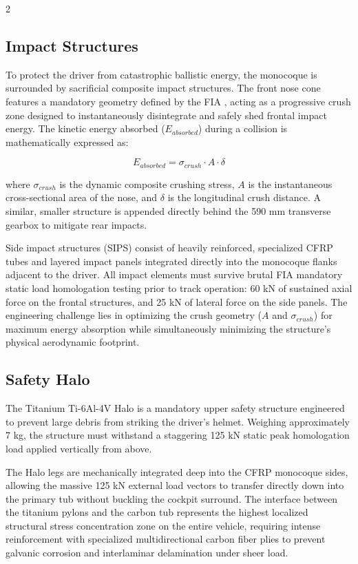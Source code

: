 \begin{multicols}{2}
\subsection{Impact Structures}

To protect the driver from catastrophic ballistic energy, the monocoque is surrounded by sacrificial composite impact structures. The front nose cone features a mandatory geometry defined by the FIA \cite{FIA_2026_Chassis_Regulations}, acting as a progressive crush zone designed to instantaneously disintegrate and safely shed frontal impact energy. The kinetic energy absorbed ($E_{absorbed}$) during a collision is mathematically expressed as:

\begin{equation} \label{eq:crush_energy}
E_{absorbed} = \sigma_{crush} \cdot A \cdot \delta
\end{equation}

where $\sigma_{crush}$ is the dynamic composite crushing stress, $A$ is the instantaneous cross-sectional area of the nose, and $\delta$ is the longitudinal crush distance. A similar, smaller structure is appended directly behind the 590 mm transverse gearbox to mitigate rear impacts. 

Side impact structures (SIPS) consist of heavily reinforced, specialized CFRP tubes and layered impact panels integrated directly into the monocoque flanks adjacent to the driver. All impact elements must survive brutal FIA mandatory static load homologation testing prior to track operation: 60 kN of sustained axial force on the frontal structures, and 25 kN of lateral force on the side panels. The engineering challenge lies in optimizing the crush geometry ($A$ and $\sigma_{crush}$) for maximum energy absorption while simultaneously minimizing the structure's physical aerodynamic footprint.

\subsection{Safety Halo}

The Titanium Ti-6Al-4V Halo is a mandatory upper safety structure engineered to prevent large debris from striking the driver's helmet. Weighing approximately 7 kg, the structure must withstand a staggering 125 kN static peak homologation load applied vertically from above. 

The Halo legs are mechanically integrated deep into the CFRP monocoque sides, allowing the massive 125 kN external load vectors to transfer directly down into the primary tub without buckling the cockpit surround. The interface between the titanium pylons and the carbon tub represents the highest localized structural stress concentration zone on the entire vehicle, requiring intense reinforcement with specialized multidirectional carbon fiber plies to prevent galvanic corrosion and interlaminar delamination under sheer load.


\end{multicols}
